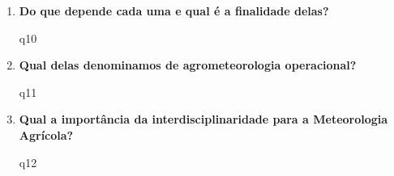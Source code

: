 \documentclass[a4paper, 12pt]{article}
\begin{document}
\begin{enumerate}
		{q9}
		
		\item\textbf{Do que depende cada uma e qual é a finalidade delas?}
		
		{q10}
		
		\item\textbf{Qual delas denominamos de agrometeorologia operacional?}
		
		{q11}
		
		\item\textbf{Qual a importância da interdisciplinaridade para a Meteorologia Agrícola?}
		
		{q12}
		
	\end{enumerate}
\end{document}
